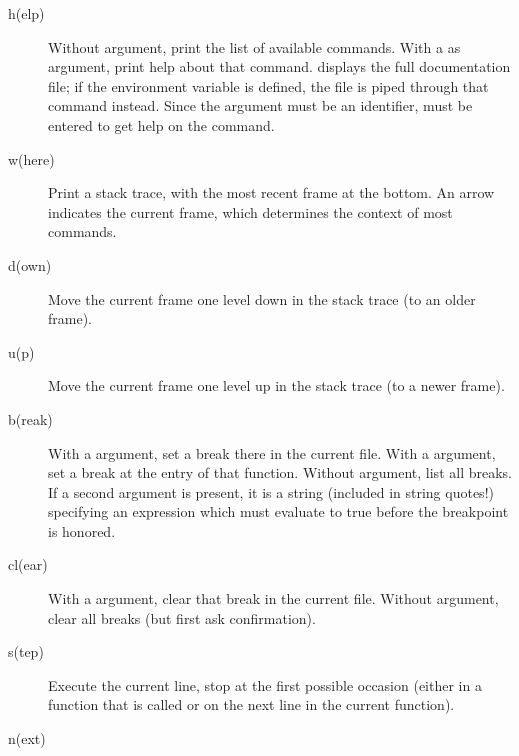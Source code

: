 \begin{description}

\item[h(elp) ]

Without argument, print the list of available commands.  With a
 as argument, print help about that command.   displays the full documentation file; if the environment variable
 is defined, the file is piped through that command
instead.  Since the  argument must be an identifier,
 must be entered to get help on the \samp{!} command.

\item[w(here)]

Print a stack trace, with the most recent frame at the bottom.  An
arrow indicates the current frame, which determines the context of
most commands.

\item[d(own)]

Move the current frame one level down in the stack trace
(to an older frame).

\item[u(p)]

Move the current frame one level up in the stack trace
(to a newer frame).

\item[b(reak) ]

With a  argument, set a break there in the current
file.  With a  argument, set a break at the entry of
that function.  Without argument, list all breaks.
If a second argument is present, it is a string (included in string
quotes!) specifying an expression which must evaluate to true before
the breakpoint is honored.

\item[cl(ear) ]

With a  argument, clear that break in the current file.
Without argument, clear all breaks (but first ask confirmation).

\item[s(tep)]

Execute the current line, stop at the first possible occasion
(either in a function that is called or on the next line in the
current function).

\item[n(ext)]


\end{description}
